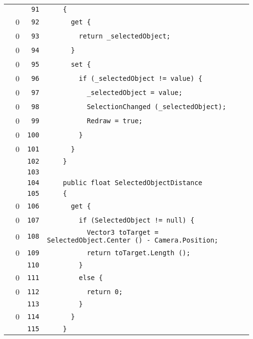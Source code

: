 \documentclass[a4paper,10pt]{article}
\begin{document}
\begin{longtable}[l]{lrrl}
\cellcolor{gray} &  & \verb~91~ & \verb~    {~\\
\cellcolor{red} & 0 & \verb~92~ & \verb~      get {~\\
\cellcolor{red} & 0 & \verb~93~ & \verb~        return _selectedObject;~\\
\cellcolor{red} & 0 & \verb~94~ & \verb~      }~\\
\cellcolor{red} & 0 & \verb~95~ & \verb~      set {~\\
\cellcolor{red} & 0 & \verb~96~ & \verb~        if (_selectedObject != value) {~\\
\cellcolor{red} & 0 & \verb~97~ & \verb~          _selectedObject = value;~\\
\cellcolor{red} & 0 & \verb~98~ & \verb~          SelectionChanged (_selectedObject);~\\
\cellcolor{red} & 0 & \verb~99~ & \verb~          Redraw = true;~\\
\cellcolor{red} & 0 & \verb~100~ & \verb~        }~\\
\cellcolor{red} & 0 & \verb~101~ & \verb~      }~\\
\cellcolor{gray} &  & \verb~102~ & \verb~    }~\\
\cellcolor{gray} &  & \verb~103~ & \verb~~\\
\cellcolor{gray} &  & \verb~104~ & \verb~    public float SelectedObjectDistance~\\
\cellcolor{gray} &  & \verb~105~ & \verb~    {~\\
\cellcolor{red} & 0 & \verb~106~ & \verb~      get {~\\
\cellcolor{red} & 0 & \verb~107~ & \verb~        if (SelectedObject != null) {~\\
\cellcolor{red} & 0 & \verb~108~ & \verb~          Vector3 toTarget = SelectedObject.Center () - Camera.Position;~\\
\cellcolor{red} & 0 & \verb~109~ & \verb~          return toTarget.Length ();~\\
\cellcolor{gray} &  & \verb~110~ & \verb~        }~\\
\cellcolor{red} & 0 & \verb~111~ & \verb~        else {~\\
\cellcolor{red} & 0 & \verb~112~ & \verb~          return 0;~\\
\cellcolor{gray} &  & \verb~113~ & \verb~        }~\\
\cellcolor{red} & 0 & \verb~114~ & \verb~      }~\\
\cellcolor{gray} &  & \verb~115~ & \verb~    }~\\

\end{longtable}
\end{document}
